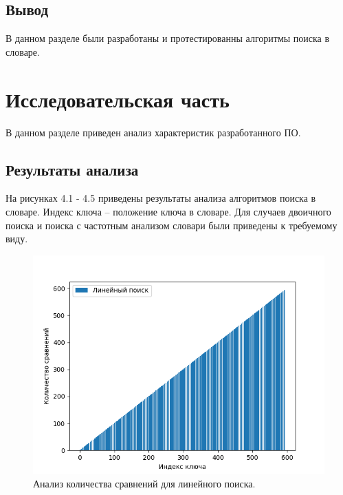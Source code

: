 \documentclass[12pt]{report}
\begin{document}
\section*{Вывод}

В данном разделе были разработаны и протестированны алгоритмы поиска в словаре.

\chapter{Исследовательская часть}

В данном разделе приведен анализ характеристик разработанного ПО.

\section{Результаты анализа}

На рисунках 4.1 - 4.5 приведены результаты анализа алгоритмов поиска в словаре. Индекс ключа -- положение ключа в словаре. Для случаев двоичного поиска и поиска с частотным анализом словари были приведены к требуемому виду.

\begin{figure}[H]
	\centering
	\includegraphics[scale=0.7]{lin_search.png}
	\caption{Анализ количества сравнений для линейного поиска.}
	\label{fig:mpr}
\end{figure}
\end{document}
